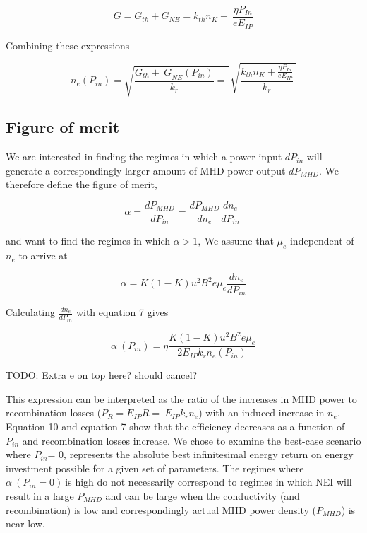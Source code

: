\begin{equation}
G = G_{th} + G_{NE} = k_{th}n_{K} + \ \frac{\eta P_{In}}{eE_{IP}}
\end{equation}

Combining these expressions

\begin{equation}
n_{e}(P_{in}) = \sqrt{\frac{{G_{th} + \ G}_{NE}(P_{in})}{k_{r}} = \ }\sqrt{\frac{k_{th}n_{K} + \frac{\eta P_{In}}{eE_{IP}}}{k_{r}}\ }
\end{equation}

\hypertarget{figure-of-merit}{%
\subsection{Figure of merit}\label{figure-of-merit}}

We are interested in finding the regimes in which a power input \(dP_{in}\) will generate a correspondingly larger amount of MHD power output \(dP_{MHD}\). We therefore define the figure of merit,

\begin{equation}
\alpha = \frac{{dP}_{MHD}}{dP_{in}} = \frac{{dP}_{MHD}}{dn_{e}}\frac{dn_{e}}{dP_{in}}\ 
\end{equation}


and want to find the regimes in which \(\alpha > 1,\ \)We assume that \(\mu_{e}\) independent of \(n_{e}\) to arrive at

\begin{equation}
\alpha = K(1 - K)u^{2}B^{2}e\mu_{e}\frac{dn_{e}}{dP_{in}}
\end{equation}


Calculating \(\frac{dn_{e}}{dP_{in}}\) with equation 7 gives

\begin{equation}
\alpha\ (P_{in}) = \eta\frac{K(1 - K)u^{2}B^{2}e\mu_{e}}{2E_{IP}k_{r}n_{e}(P_{in})}
\end{equation}

TODO: Extra e on top here? should cancel?

This expression can be interpreted as the ratio of the increases in MHD power to recombination losses (\(P_{R} = E_{IP}R = \ E_{IP}k_{r}n_{e}\)) with an induced increase in \(n_{e}\). Equation 10 and equation 7 show that the efficiency decreases as a function of \(P_{in}\) and recombination losses increase. We chose to examine the best-case scenario where \(P_{in}\)= 0, represents the absolute best infinitesimal energy return on energy investment possible for a given set of parameters. The regimes where \(\alpha\ \left( P_{in} = 0 \right)\ \)is high do not necessarily correspond to regimes in which NEI will result in a large \(P_{MHD}\) and can be large when the conductivity (and recombination) is low and correspondingly actual MHD power density (\(P_{MHD}\)) is near low.


